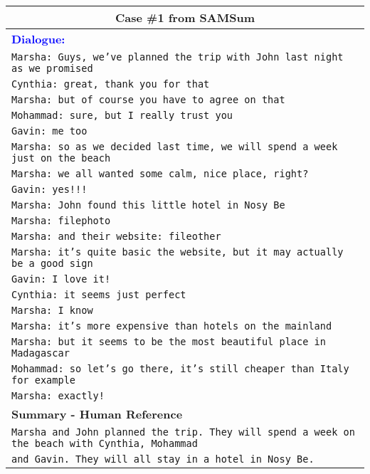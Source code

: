 \documentclass[11pt]{article}
\begin{document}
\begin{table*}[t]
        \centering
        \begin{adjustbox}{width=1.00\textwidth,center}
        \begin{tabular}{ | l | }
        \toprule
        \multicolumn{1}{|c|}{\textbf{Case \#1 from SAMSum}} \\ \hline
        \textbf{\textcolor{blue}{Dialogue:}} \\ \hline
        
        \texttt{Marsha: Guys, we've planned the trip with John last night as we promised} \\ 
        \texttt{Cynthia: great, thank you for that} \\
        \texttt{Marsha: but of course you have to agree on that} \\
        \texttt{Mohammad: sure, but I really trust you} \\
        \texttt{Gavin: me too} \\
        \texttt{Marsha: so as we decided last time, we will spend a week just on the beach} \\
        \texttt{Marsha: we all wanted some calm, nice place, right?} \\
        \texttt{Gavin: yes!!! } \\
        \texttt{Marsha: John found this little hotel in Nosy Be} \\
        \texttt{Marsha: filephoto } \\
        \texttt{Marsha: and their website: fileother } \\
        \texttt{Marsha: it's quite basic the website, but it may actually be a good sign} \\
        \texttt{Gavin: I love it!} \\
        \texttt{Cynthia: it seems just perfect} \\
        \texttt{Marsha: I know} \\
        \texttt{Marsha: it's more expensive than hotels on the mainland} \\
        \texttt{Marsha: but it seems to be the most beautiful place in Madagascar} \\
        \texttt{Mohammad: so let's go there, it's still cheaper than Italy for example} \\
        \texttt{Marsha: exactly!} \\
        \hline \hline
        
        \textbf{Summary - Human Reference} \\ \hline
        \texttt{Marsha and John planned the trip. They will spend a week on the beach with Cynthia, Mohammad} \\ 
        \texttt{and Gavin. They will all stay in a hotel in Nosy Be.} \\ \hline
        

\end{tabular}
\end{adjustbox}
\end{table*}
\end{document}
